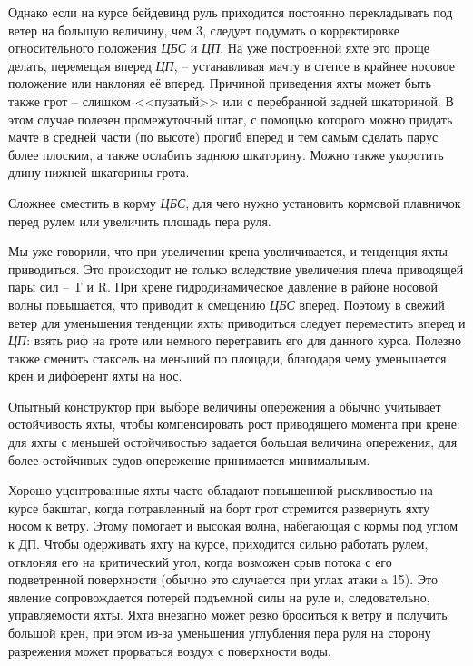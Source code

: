 Однако если на курсе бейдевинд руль приходится постоянно перекладывать под ветер на большую величину, чем 3\gr, следует подумать о корректировке относительного положения \textit{ЦБС} и \textit{ЦП}. На уже построенной яхте это проще делать, перемещая вперед \textit{ЦП}, \--- устанавливая мачту в степсе в крайнее носовое положение или наклоняя её вперед. Причиной приведения яхты может быть также грот \--- слишком <<пузатый>> или с перебранной задней шкаториной. В этом случае полезен промежуточный штаг, с помощью которого можно придать мачте в средней части (по высоте) прогиб вперед и тем самым сделать парус более плоским, а также ослабить заднюю шкаторину. Можно также укоротить длину нижней шкаторины грота. 

Сложнее сместить в корму \textit{ЦБС}, для чего нужно установить кормовой плавничок перед рулем или увеличить площадь пера руля.

Мы уже говорили, что при увеличении крена увеличивается, и тенденция яхты приводиться. Это происходит не только вследствие увеличения плеча приводящей пары сил \--- \ve T и \ve R. При крене гидродинамическое давление в районе носовой волны повышается, что приводит к смещению \textit{ЦБС} вперед. Поэтому в свежий ветер для уменьшения тенденции яхты приводиться следует переместить вперед и \textit{ЦП}: взять риф на гроте или немного перетравить его для данного курса. Полезно также сменить стаксель на меньший по площади, благодаря чему уменьшается крен и дифферент яхты на нос.

Опытный конструктор при выборе величины опережения а обычно учитывает остойчивость яхты, чтобы компенсировать рост приводящего момента при крене: для яхты с меньшей остойчивостью задается большая величина опережения, для более остойчивых судов опережение принимается минимальным.

Хорошо уцентрованные яхты часто обладают повышенной рыскливостью на курсе бакштаг, когда потравленный на борт грот стремится развернуть яхту носом к ветру. Этому помогает и высокая волна, набегающая с кормы под углом к ДП. Чтобы одерживать яхту на курсе, приходится сильно работать рулем, отклоняя его на критический угол, когда возможен срыв потока с его подветренной поверхности (обычно это случается при углах атаки a 15\gr). Это явление сопровождается потерей подъемной силы на руле и, следовательно, управляемости яхты. Яхта внезапно может резко броситься к ветру и получить большой крен, при этом из-за уменьшения углубления пера руля на сторону разрежения может прорваться воздух с поверхности воды. 

